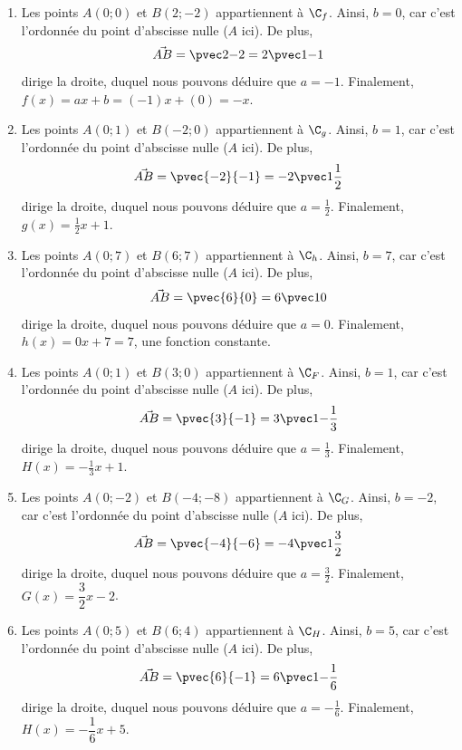 {	\begin{enumerate}
		\item[$f$:] 
			Les points $A(0;0)$ et $B(2;-2)$ appartiennent à $\C_f$.
			Ainsi, $b=0$, car c'est l'ordonnée du point d'abscisse nulle ($A$ ici).
			De plus, 
				\[ \vec{AB} = \pvec2{-2} = 2 \pvec1{-1} \]
			dirige la droite, duquel nous pouvons déduire que $a = -1$.
			Finalement, $f(x) = ax+b = (-1)x + (0) = -x$.
		\item[$g$:] 
			Les points $A(0;1)$ et $B(-2;0)$ appartiennent à $\C_g$.
			Ainsi, $b=1$, car c'est l'ordonnée du point d'abscisse nulle ($A$ ici).
			De plus, 
				\[ \vec{AB} = \pvec{-2}{-1} = -2 \pvec1{\frac12} \]
			dirige la droite, duquel nous pouvons déduire que $a = \frac12$.
			Finalement, $g(x) = \frac12 x + 1$.
		\item[$h$:] 
			Les points $A(0;7)$ et $B(6;7)$ appartiennent à $\C_h$.
			Ainsi, $b=7$, car c'est l'ordonnée du point d'abscisse nulle ($A$ ici).
			De plus, 
				\[ \vec{AB} = \pvec{6}{0} = 6 \pvec10 \]
			dirige la droite, duquel nous pouvons déduire que $a = 0$.
			Finalement, $h(x) = 0x+7 = 7$, une fonction constante.
		\item[$F$:] 
			Les points $A(0;1)$ et $B(3;0)$ appartiennent à $\C_F$.
			Ainsi, $b=1$, car c'est l'ordonnée du point d'abscisse nulle ($A$ ici).
			De plus, 
				\[ \vec{AB} = \pvec{3}{-1} = 3 \pvec1{-\frac13} \]
			dirige la droite, duquel nous pouvons déduire que $a = \frac13$.
			Finalement, $H(x) = -\frac13 x + 1$.
		\item[$G$:] 
			Les points $A(0;-2)$ et $B(-4;-8)$ appartiennent à $\C_G$.
			Ainsi, $b=-2$, car c'est l'ordonnée du point d'abscisse nulle ($A$ ici).
			De plus, 
				\[ \vec{AB} = \pvec{-4}{-6} = -4 \pvec1{\frac32} \]
			dirige la droite, duquel nous pouvons déduire que $a = \frac32$.
			Finalement, $G(x) = \dfrac32 x - 2$.
		\item[$H$:] 
			Les points $A(0;5)$ et $B(6;4)$ appartiennent à $\C_H$.
			Ainsi, $b=5$, car c'est l'ordonnée du point d'abscisse nulle ($A$ ici).
			De plus, 
				\[ \vec{AB} = \pvec{6}{-1} = 6 \pvec1{-\frac16} \]
			dirige la droite, duquel nous pouvons déduire que $a = -\frac16$.
			Finalement, $H(x) = -\dfrac16 x + 5$.
	\end{enumerate}
}


